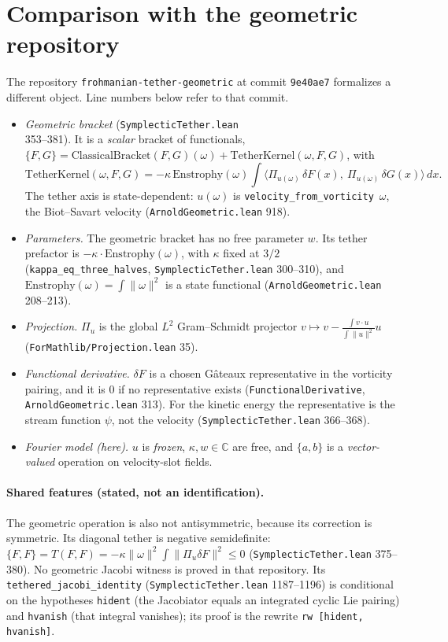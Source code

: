 \documentclass[11pt]{article}\emergencystretch=2em
\theoremstyle{definition}\newtheorem{definition}[theorem]{Definition}\theoremstyle{remark}\newtheorem{remark}[theorem]{Remark}
\begin{document}
\section{Comparison with the geometric repository}
The repository \texttt{frohmanian-tether-geometric} at commit \texttt{9e40ae7} formalizes a different object. Line numbers below refer to that commit.
\begin{itemize}
\item \emph{Geometric bracket} (\texttt{SymplecticTether.lean}\\ 353--381). It is a \emph{scalar} bracket of functionals, $\{F,G\}=\mathrm{ClassicalBracket}(F,G)(\omega)+\mathrm{TetherKernel}(\omega,F,G)$, with
\[\mathrm{TetherKernel}(\omega,F,G)=-\kappa\,\mathrm{Enstrophy}(\omega)\int\big\langle \Pi_{u(\omega)}\,\delta F(x),\ \Pi_{u(\omega)}\,\delta G(x)\big\rangle\,dx .\]
The tether axis is state-dependent: $u(\omega)$ is \texttt{velocity\_from\_vorticity}~$\omega$, the Biot--Savart velocity (\texttt{ArnoldGeometric.lean} 918).
\item \emph{Parameters.} The geometric bracket has no free parameter $w$. Its tether prefactor is $-\kappa\cdot\mathrm{Enstrophy}(\omega)$, with $\kappa$ fixed at $3/2$ (\texttt{kappa\_eq\_three\_halves}, \texttt{SymplecticTether.lean} 300--310), and $\mathrm{Enstrophy}(\omega)=\int\|\omega\|^2$ is a state functional (\texttt{ArnoldGeometric.lean} 208--213).
\item \emph{Projection.} $\Pi_u$ is the global $L^2$ Gram--Schmidt projector $v\mapsto v-\frac{\int v\cdot u}{\int\|u\|^2}u$ (\texttt{ForMathlib/\allowbreak Projection.lean} 35).
\item \emph{Functional derivative.} $\delta F$ is a chosen G\^ateaux representative in the vorticity pairing, and it is $0$ if no representative exists (\texttt{FunctionalDerivative}, \texttt{ArnoldGeometric.lean} 313). For the kinetic energy the representative is the stream function $\psi$, not the velocity (\texttt{SymplecticTether.lean} 366--368).
\item \emph{Fourier model (here).} $u$ is \emph{frozen}, $\kappa,w\in\mathbb C$ are free, and $\{a,b\}$ is a \emph{vector-valued} operation on velocity-slot fields.
\end{itemize}
\paragraph{Shared features (stated, not an identification).} The geometric operation is also not antisymmetric, because its correction is symmetric. Its diagonal tether is negative semidefinite: $\{F,F\}=T(F,F)=-\kappa\|\omega\|^2\int\|\Pi_u\delta F\|^2\le0$ (\texttt{SymplecticTether.lean} 375--380). No geometric Jacobi witness is proved in that repository. Its \texttt{tethered\_jacobi\_identity} (\texttt{SymplecticTether.lean} 1187--1196) is conditional on the hypotheses \texttt{hident} (the Jacobiator equals an integrated cyclic Lie pairing) and \texttt{hvanish} (that integral vanishes); its proof is the rewrite \texttt{rw [hident, hvanish]}.
\end{document}

